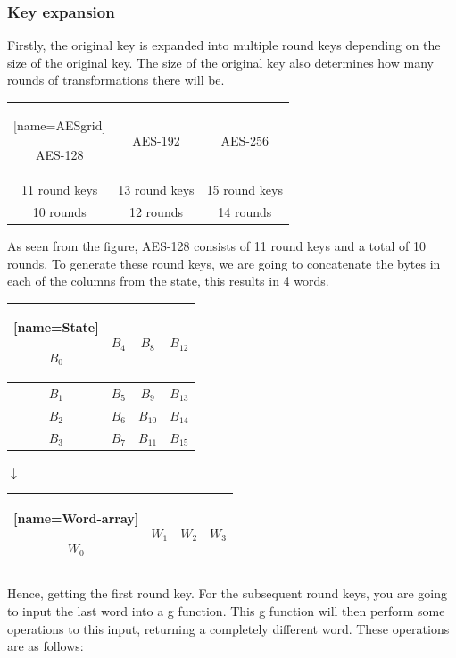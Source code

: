 \documentclass{article}
\begin{document}
\subsubsection{Key expansion}
Firstly, the original key is expanded into multiple round keys depending on the size of the original key. The size of the original key also determines how many rounds of transformations there will be.\medskip
\begin{center}
\begin{NiceTabular}{|c|c|c|}[name=AESgrid]

\hline
AES-128&AES-192&AES-256\\  
11 round keys& 13 round keys& 15 round keys\\ 
10 rounds&12 rounds&14 rounds\\ 
\hline

\end{NiceTabular}
\end{center}
\medskip
As seen from the figure, AES-128 consists of 11 round keys and a total of 10 rounds. To generate these round keys, we are going to concatenate the bytes in each of the columns from the state, this results in 4 words. 
\begin{center}
\begin{NiceTabular}{|c|c|c|c|}[name=State]

\hline
\(B_{0}\)&\(B_{4}\)&\(B_{8}\)&\(B_{12}\)\\  \hline
\(B_{1}\)&\(B_{5}\)&\(B_{9}\)&\(B_{13}\)\\ \hline
\(B_{2}\)&\(B_{6}\)&\(B_{10}\)&\(B_{14}\)\\ \hline
\(B_{3}\)&\(B_{7}\)&\(B_{11}\)&\(B_{15}\)\\ \hline

\end{NiceTabular}
\end{center}
\begin{center}
$\downarrow$
\end{center}
\begin{center}
\begin{NiceTabular}{|c|c|c|c|}[name=Word-array]

\hline
\(W_{0}\)&\(W_{1}\)&\(W_{2}\)&\(W_{3}\)\\
\hline

\end{NiceTabular}
\end{center}
Hence, getting the first round key. For the subsequent round keys, you are going to input the last word into a g function. This g function will then perform some operations to this input, returning a completely different word. These operations are as follows:
\end{document}
